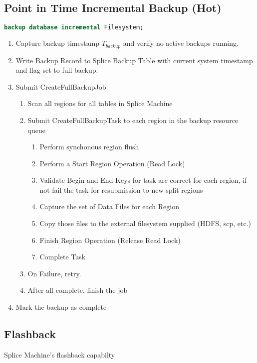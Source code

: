 \subsection{Point in Time Incremental Backup (Hot)}
	
\begin{lstlisting}[frame=single,captionpos=b,language=SQL,caption=Procedure to
Perform an Incremental Backup] 
backup database incremental Filesystem;
\end{lstlisting}

\begin{enumerate}
	\item Capture backup timestamp $T_{backup}$ and verify no active backups
	running.
	\item Write Backup Record to Splice Backup Table with current system timestamp
	and flag set to full backup.
	\item Submit CreateFullBackupJob 
	\begin{enumerate}
	\item Scan all regions for all tables in Splice Machine
	\item Submit CreateFullBackupTask to each region in the backup resource queue
	\begin{enumerate}
	\item Perform synchonous region flush 
	\item Perform a Start Region Operation (Read Lock)
	\item Validate Begin and End Keys for task are correct for each region, if not
	fail the task for resubmission to new split regions
	\item Capture the set of Data Files for each Region
	\item Copy those files to the external filesystem supplied (HDFS, scp, etc.)
	\item Finish Region Operation (Release Read Lock)
	\item Complete Task
	\end{enumerate}
	\item On Failure, retry.
	\item After all complete, finish the job
	\end{enumerate}
	\item Mark the backup as complete
\end{enumerate}

\subsection{Flashback}
Splice Machine's flashback capabilty

